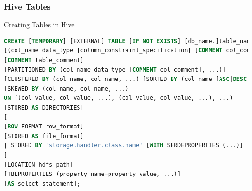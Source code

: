 \subsubsection{Hive Tables}
\begin{frame}[fragile]{Creating Tables in Hive}
\vspace{-.7cm}
\begin{lstlisting}[caption={Create Table Commands},language=SQL]
CREATE [TEMPORARY] [EXTERNAL] TABLE [IF NOT EXISTS] [db_name.]table_name
[(col_name data_type [column_constraint_specification] [COMMENT col_comment], ... [constraint_specification])]
[COMMENT table_comment]
[PARTITIONED BY (col_name data_type [COMMENT col_comment], ...)]
[CLUSTERED BY (col_name, col_name, ...) [SORTED BY (col_name [ASC|DESC], ...)] INTO num_buckets BUCKETS]
[SKEWED BY (col_name, col_name, ...)
ON ((col_value, col_value, ...), (col_value, col_value, ...), ...)
[STORED AS DIRECTORIES]
[
[ROW FORMAT row_format] 
[STORED AS file_format]
| STORED BY 'storage.handler.class.name' [WITH SERDEPROPERTIES (...)]
]
[LOCATION hdfs_path]
[TBLPROPERTIES (property_name=property_value, ...)]
[AS select_statement];
\end{lstlisting}

\end{frame}

